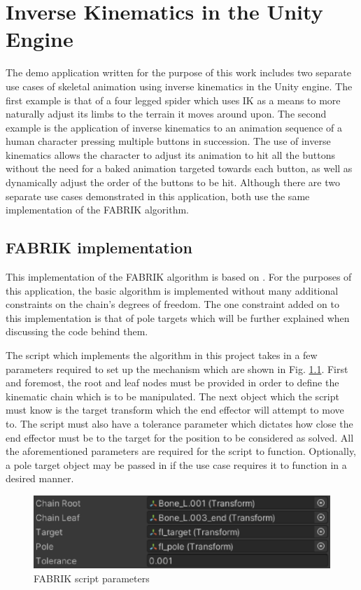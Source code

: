 \chapter{Inverse Kinematics in the Unity Engine} 
The demo application written for the purpose of this work includes two separate
use cases of skeletal animation using inverse kinematics in the Unity engine.
The first example is that of a four legged spider which uses IK as a means to
more naturally adjust its limbs to the terrain it moves around upon. The second
example is the application of inverse kinematics to an animation sequence of
a human character pressing multiple buttons in succession. The use of inverse
kinematics allows the character to adjust its animation to hit all the buttons
without the need for a baked animation targeted towards each button, as well as
dynamically adjust the order of the buttons to be hit. Although there are two
separate use cases demonstrated in this application, both use the same
implementation of the FABRIK algorithm. 


\section{FABRIK implementation}
This implementation of the FABRIK algorithm is based on \cite{Aristidou2011}. For the
purposes of this application, the basic algorithm is implemented without many
additional constraints on the chain's degrees of freedom. The one
constraint added on to this implementation is that of pole targets which will be
further explained when discussing the code behind them.

The script which implements the algorithm in this project takes in a few
parameters required to set up the mechanism which are shown in Fig.
\ref{fig:params}. First and foremost, the root and leaf nodes must be provided
in order to define the kinematic chain which is to be manipulated. The next
object which the script must know is the target transform which the
end effector will attempt to move to. The script must also have a tolerance
parameter which dictates how close the end effector must be to the target for
the position to be considered as solved. All the aforementioned parameters are
required for the script to function. Optionally, a pole target object may be
passed in if the use case requires it to function in a desired manner. 

\begin{figure}
    \centering
    \includegraphics{grafika/parametry_ik.eps}
    \caption{FABRIK script parameters}
    \label{fig:params}
\end{figure}

